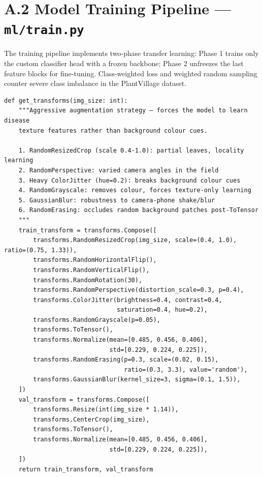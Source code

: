 \documentclass[12pt,a4paper]{report}
\begin{document}
\section*{A.2 \quad Model Training Pipeline --- \texttt{ml/train.py}}

The training pipeline implements two-phase transfer learning: Phase 1 trains only the custom classifier head with a frozen backbone; Phase 2 unfreezes the last feature blocks for fine-tuning.  Class-weighted loss and weighted random sampling counter severe class imbalance in the PlantVillage dataset.

\begin{lstlisting}[style=python, caption={Data augmentation pipeline for real-world generalization (ml/train.py)}]
def get_transforms(img_size: int):
    """Aggressive augmentation strategy — forces the model to learn disease
    texture features rather than background colour cues.

    1. RandomResizedCrop (scale 0.4-1.0): partial leaves, locality learning
    2. RandomPerspective: varied camera angles in the field
    3. Heavy ColorJitter (hue=0.2): breaks background colour cues
    4. RandomGrayscale: removes colour, forces texture-only learning
    5. GaussianBlur: robustness to camera-phone shake/blur
    6. RandomErasing: occludes random background patches post-ToTensor
    """
    train_transform = transforms.Compose([
        transforms.RandomResizedCrop(img_size, scale=(0.4, 1.0), ratio=(0.75, 1.33)),
        transforms.RandomHorizontalFlip(),
        transforms.RandomVerticalFlip(),
        transforms.RandomRotation(30),
        transforms.RandomPerspective(distortion_scale=0.3, p=0.4),
        transforms.ColorJitter(brightness=0.4, contrast=0.4,
                               saturation=0.4, hue=0.2),
        transforms.RandomGrayscale(p=0.05),
        transforms.ToTensor(),
        transforms.Normalize(mean=[0.485, 0.456, 0.406],
                             std=[0.229, 0.224, 0.225]),
        transforms.RandomErasing(p=0.3, scale=(0.02, 0.15),
                                 ratio=(0.3, 3.3), value='random'),
        transforms.GaussianBlur(kernel_size=3, sigma=(0.1, 1.5)),
    ])
    val_transform = transforms.Compose([
        transforms.Resize(int(img_size * 1.14)),
        transforms.CenterCrop(img_size),
        transforms.ToTensor(),
        transforms.Normalize(mean=[0.485, 0.456, 0.406],
                             std=[0.229, 0.224, 0.225]),
    ])
    return train_transform, val_transform
\end{lstlisting}
\end{document}

